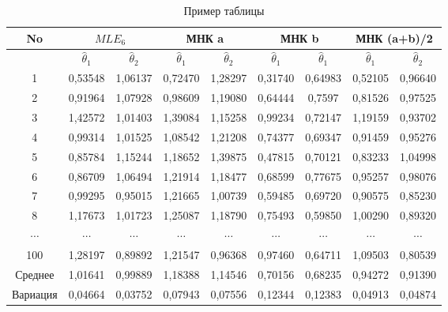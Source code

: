 \begin{table}[hp] \label{table:table1}
\caption{Пример таблицы}
\begin{small}
\begin{center}
\begin{tabular}{|c|c|c|c|c|c|c|c|c|}
\hline
No & \multicolumn{2}{|c|}{$MLE_{6}$} & \multicolumn{2}{|c|}{МНК a} & \multicolumn{2}{|c|}{МНК b} & \multicolumn{2}{|c|}{МНК (a+b)/2} \\
\hline
 & $\hat{\theta}_{1}$ & $\hat{\theta}_{2}$   &    $\hat{\theta}_{1}$ & $\hat{\theta}_{2}$  & $\hat{\theta}_{1}$ & $\hat{\theta}_{1}$ & $\hat{\theta}_{1}$ & $\hat{\theta}_{2}$\\
\hline
1& 0,53548  &1,06137   &    0,72470 &  1,28297  &  0,31740 &  0,64983 &  0,52105 &  0,96640\\
\hline
2& 0,91964 &1,07928   &    0,98609 &  1,19080  &  0,64444 &  0,7597   &  0,81526 &  0,97525\\
\hline
3& 1,42572 &1,01403   &    1,39084 &  1,15258  &  0,99234 &  0,72147 &  1,19159 &  0,93702\\
\hline
4& 0,99314 &1,01525    &    1,08542 &  1,21208  &  0,74377 &  0,69347 &  0,91459 &  0,95276\\
\hline
5& 0,85784 &1,15244   &    1,18652 &  1,39875  &  0,47815 &  0,70121 &  0,83233 &  1,04998\\
\hline
6& 0,86709 &1,06494   &    1,21914 &  1,18477  &  0,68599 &  0,77675 &  0,95257  &  0,98076\\
\hline
7& 0,99295 &0,95015   &    1,21665 &  1,00739  &  0,59485 &  0,69720 &  0,90575 &  0,85230\\
\hline
8& 1,17673 &1,01723   &    1,25087 &  1,18790  &  0,75493 &  0,59850 &  1,00290 &  0,89320\\
\hline $\cdots$ & $\cdots$ & $\cdots$ & $\cdots$ & $\cdots$ &
$\cdots$ & $\cdots$ & $\cdots$ & $\cdots$\\ \hline
100& 1,28197 &0,89892 &    1,21547 &  0,96368   &  0,97460 &  0,64711 &  1,09503 &  0,80539\\
\hline
Среднее& 1,01641 & 0,99889 & 1,18388 & 1,14546 & 0,70156 & 0,68235 & 0,94272 & 0,91390\\
\hline
Вариация&0,04664 & 0,03752 & 0,07943 & 0,07556 & 0,12344 & 0,12383 & 0,04913 & 0,04874\\
\hline
\end{tabular}
\end{center}
\end{small}
\end{table}
